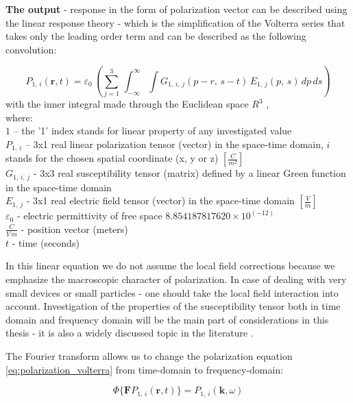 \documentclass[12pt,twoside,a4paper]{article}
\numberwithin{equation}{subsection}
\numberwithin{figure}{subsection}
\begin{document}
\textbf{The output} - response in the form of polarization vector can be described using the linear response theory - which is the
simplification of the Volterra series that takes only the leading order term and can be described as the following convolution:

\begin{equation} \label{eq:polarization_volterra}
  {P_{1, \,i}} (\textbf{r}, t) = {\varepsilon_{0}}\, \left(  \! \sum_{j=1}^{3}\,\int_{ -
  \infty }^{\infty }\int {G_{1, \,i, \,j}}(p - r, \,s - t)\,{E_{1,\,j}}(p, \,s)\,dp\,ds \!  \right)
\end{equation}
with the inner integral made through the Euclidean space $R^{3}$ \cite{thesis_novak},\\
where: \\
${1}$ -- the '1' index stands for linear property of any investigated value \\
${P_{1, \,i}}$ -- 3x1 real linear polarization tensor (vector) in the space-time domain, $i$ stands for the chosen spatial
coordinate (x, y or z) $[\frac {C}{m^{2}}]$ \\
${G_{1, \,i, \,j}}$ - 3x3 real susceptibility tensor (matrix) defined by a linear Green function in the space-time domain
\cite{fakiszscan} \\ ${E_{1, \,j}}$ - 3x1 real electric field tensor (vector) in the space-time domain $[\frac {V}{m}]$ \\
${\varepsilon_{0}}$ - electric permittivity of free space $8.854187817620 \times 10^{( - 12)}$ \\
$\frac {C}{V\,m}$  -  position vector (meters)  \\
$t$ - time (seconds)

In this linear equation we do not assume the local field corrections \cite{chui_lf_correction} because we emphasize the macroscopic
character of polarization. In case of dealing with very small devices or small particles - one should take the local
field interaction into account. Investigation of the properties of the susceptibility tensor both in time domain and frequency
domain will be the main part of considerations in this thesis - it is also a widely discussed topic in the literature
\cite{boyd_nlo, prasad_intro_nlo, Levenson_dispersion, trager_springer, bloembergen_nonlinear}.

The Fourier transform allows us to change the polarization equation \ref{eq:polarization_volterra} from time-domain to frequency-domain:

\begin{equation} \label{eq:polarization_frequency}
   \Phi \{ \textbf{F} P_{1, \, i} ( \textbf{r}, t) \} = P_{1, \, i} (\textbf{k}, \omega )
\end{equation}
\end{document}
